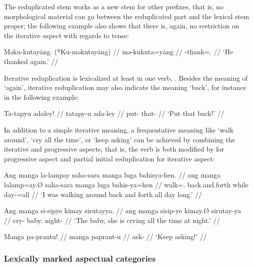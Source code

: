 The reduplicated stem works as a new stem for other prefixes, that is, no 
morphological material can go between the reduplicated part and the lexical 
stem proper; the following example also shows that there is, again, no 
restriction on the iterative aspect with regards to tense:

\ex\begingl
	\gla Məku-kutayāng. \quad \textup{(*}Ku-məkutayāng\textup{)} //
	\glb mə-ku\til{}kuta=yāng //
	\glc \Pst{}-\Iter{}\til{}thank=\TsgM{}.\Aarg{} //
	\glft `He thanked again.' //
\endgl\xe

Iterative reduplication is lexicalized at least in one verb, 
. Besides the meaning of `again', iterative 
reduplication may also indicate the meaning `back', for instance in the 
following example:

\ex\begingl
	\gla Ta-tapyu adaley! //
	\glb ta\til{}tapy-u ada-ley //
	\glc \Iter{}\til{}put-\Imp{} that-\PargI{} //
	\glft `Put that back!' //
\endgl\xe

In addition to a simple iterative meaning, a frequentative meaning like `walk 
around', `cry all the time', or `keep asking' can be achieved by combining the 
iterative and progressive aspects, that is, the verb is both modified by 
 for progressive aspect and partial initial reduplication for 
iterative aspect:

\pex
\a\begingl
	\gla Ang manga la-lampay saha-sara manga luga bahisya-hen. //
	\glb ang manga la\til{}lamp=ay.Ø saha-sara manga luga bahis-ya=hen //
	\glc \AgtT{} \Prog{} \Iter{}\til{}walk=\Fsg{}.\Top{} back.and.forth 
		\Dir{} while day-\Loc{}=all //
	\glft `I was walking around back and forth all day long.' //
\endgl

\a\begingl
	\gla Ang manga si-sipye kimay sirutayya. //
	\glb ang manga si\til{}sip-ye kimay.Ø sirutay-ya //
	\glc \AgtT{} \Prog{} \Iter{}\til{}cry-\TsgF{} baby.\Top{} 
		night-\Loc{} //
	\glft `The baby, she is crying all the time at night.' //
\endgl

\a\begingl
	\gla Manga pa-prantu! //
	\glb manga pa\til{}prant-u //
	\glc \Prog{} \Iter{}\til{}ask-\Imp{} //
	\glft `Keep asking!' //
\endgl

\xe


\subsubsection{Lexically marked aspectual categories}

